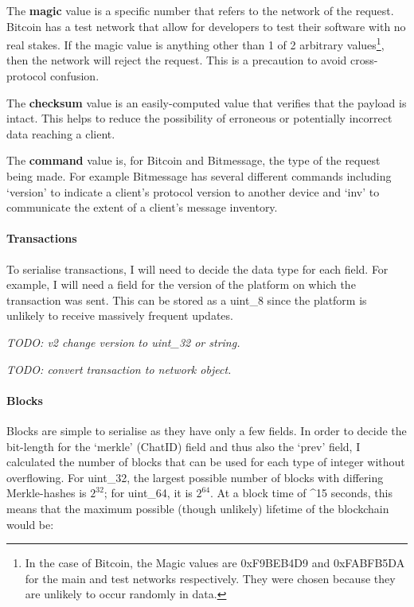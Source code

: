 \documentclass{article}
\begin{document}
The \textbf{magic} value is a specific number that refers to the network of the request. Bitcoin has a test network that allow for developers to test their software with no real stakes. If the magic value is anything other than 1 of 2 arbitrary values\footnote{In the case of Bitcoin, the Magic values are 0xF9BEB4D9 and 0xFABFB5DA for the main and test networks respectively. They were chosen because they are unlikely to occur randomly in data.}, then the network will reject the request. This is a precaution to avoid cross-protocol confusion.

The \textbf{checksum} value is an easily-computed value that verifies that the payload is intact. This helps to reduce the possibility of erroneous or potentially incorrect data reaching a client.

The \textbf{command} value is, for Bitcoin and Bitmessage, the type of the request being made. For example Bitmessage has several different commands including `version' to indicate a client's protocol version to another device and `inv' to communicate the extent of a client's message inventory.

\paragraph{Transactions}
To serialise transactions, I will need to decide the data type for each field. For example, I will need a field for the version of the platform on which the transaction was sent. This can be stored as a uint\_8 since the platform is unlikely to receive massively frequent updates. 

\textit{TODO: v2 change version to uint\_32 or string.}

\textit{TODO: convert transaction to network object.}


\paragraph{Blocks}
Blocks are simple to serialise as they have only a few fields. In order to decide the bit-length for the `merkle' (ChatID) field and thus also the `prev' field, I calculated the number of blocks that can be used for each type of integer without overflowing. For uint\_32, the largest possible number of blocks with differing Merkle-hashes is $2^{32}$; for uint\_64, it is $2^{64}$. At a block time of \textasciicircum15 seconds, this means that the maximum possible (though unlikely) lifetime of the blockchain would be:
\end{document}
